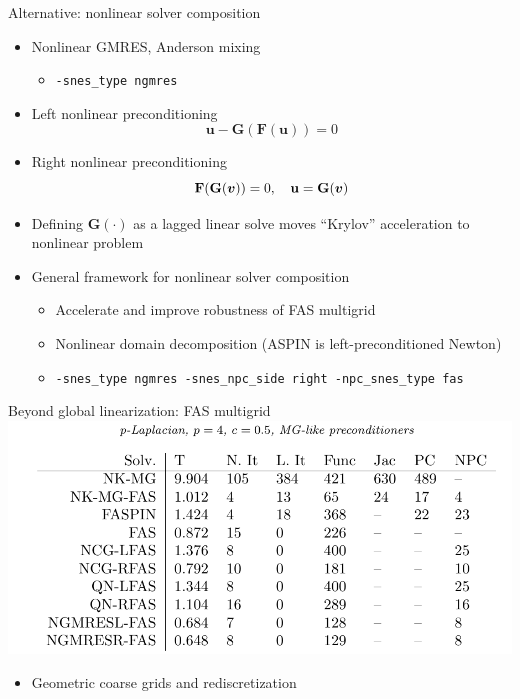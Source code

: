 \documentclass{beamer}
\newcommand{\vu}{\mathbf{u}}
\newcommand{\vF}{\mathbf{F}}
\newcommand{\vG}{\mathbf{G}}
\begin{document}
\begin{frame}{Alternative: nonlinear solver composition}
  \begin{itemize}
  \item Nonlinear GMRES, Anderson mixing
    \begin{itemize}
    \item \texttt{-snes\_type ngmres}
    \end{itemize}
  \item Left nonlinear preconditioning
    \begin{equation*}
      \vu - \vG(\vF(\vu)) = 0
    \end{equation*}
  \item Right nonlinear preconditioning
    \begin{equation*}
      \vF(\vG(\vv)) = 0, \quad \vu = \vG(\vv)
    \end{equation*}
  \item Defining $\vG(\cdot)$ as a lagged linear solve moves ``Krylov'' acceleration to nonlinear problem
  \item General framework for nonlinear solver composition
    \begin{itemize}
    \item Accelerate and improve robustness of FAS multigrid
    \item Nonlinear domain decomposition (ASPIN is left-preconditioned Newton)
    \item \texttt{-snes\_type ngmres -snes\_npc\_side right -npc\_snes\_type fas}
    \end{itemize}
  \end{itemize}
\end{frame}

\begin{frame}{Beyond global linearization: FAS multigrid}
  \includegraphics[width=\textwidth]{figures/BruneNGMRESFAS.png}
  \begin{itemize}
  \item Geometric coarse grids and rediscretization
  \end{itemize}
\end{frame}
\end{document}
